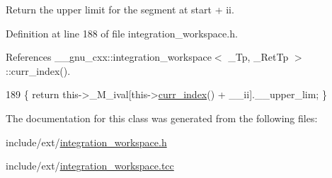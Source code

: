 Return the upper limit for the segment at start + ii. 

Definition at line 188 of file integration\+\_\+workspace.\+h.



References \+\_\+\+\_\+gnu\+\_\+cxx\+::integration\+\_\+workspace$<$ \+\_\+\+Tp, \+\_\+\+Ret\+Tp $>$\+::curr\+\_\+index().


\begin{DoxyCode}
189       \{ \textcolor{keywordflow}{return} this->\_M\_ival[this->\hyperlink{class____gnu__cxx_1_1integration__workspace_a51a384b1777615943add69f1895454f5}{curr\_index}() + \_\_ii].\_\_upper\_lim; \}
\end{DoxyCode}


The documentation for this class was generated from the following files\+:\begin{DoxyCompactItemize}
\item 
include/ext/\hyperlink{integration__workspace_8h}{integration\+\_\+workspace.\+h}\item 
include/ext/\hyperlink{integration__workspace_8tcc}{integration\+\_\+workspace.\+tcc}\end{DoxyCompactItemize}
